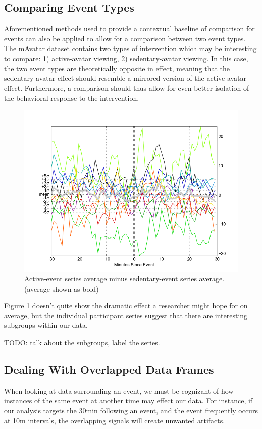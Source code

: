 \documentclass[review,journal]{vgtc}         %
\begin{document}
\subsection{Comparing Event Types}
Aforementioned methods used to provide a contextual baseline of comparison for events can also be applied to allow for a comparison between two event types.
The mAvatar dataset contains two types of intervention which may be interesting to compare: 1) active-avatar viewing, 2) sedentary-avatar viewing.
In this case, the two event types are theoretically opposite in effect, meaning that the sedentary-avatar effect should resemble a mirrored version of the active-avatar effect.
Furthermore, a comparison should thus allow for even better isolation of the behavioral response to the intervention.

\begin{figure}
\centering
\includegraphics[width=0.9\columnwidth]{./img/mAvatar_difference_events.png}
\caption{Active-event series average minus sedentary-event series average. (average shown as bold)}
\label{fig:mAvatarDifference}
\end{figure}

Figure \ref{fig:mAvatarDifference} doesn't quite show the dramatic effect a researcher might hope for on average, but the individual participant series suggest that there are interesting subgroups within our data.

TODO: talk about the subgroups, label the series.

\subsection{Dealing With Overlapped Data Frames}
When looking at data surrounding an event, we must be cognizant of how instances of the same event at another time may effect our data. For instance, if our analysis targets the 30min following an event, and the event frequently occurs at 10m intervals, the overlapping signals will create unwanted artifacts.
\end{document}
